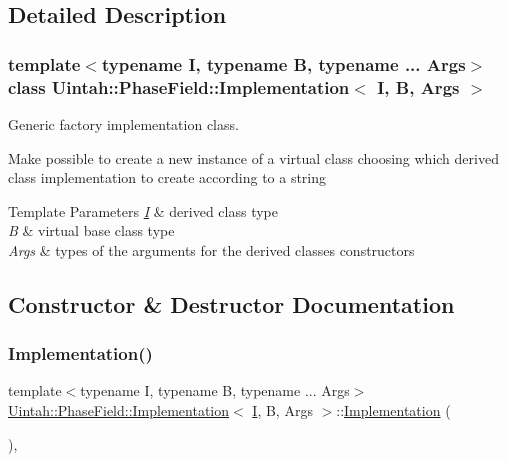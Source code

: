 \subsection{Detailed Description}
\subsubsection*{template$<$typename I, typename B, typename ... Args$>$\newline
class Uintah\+::\+Phase\+Field\+::\+Implementation$<$ I, B, Args $>$}

Generic factory implementation class. 

Make possible to create a new instance of a virtual class choosing which derived class implementation to create according to a string


\begin{DoxyTemplParams}{Template Parameters}
{\em \hyperlink{structUintah_1_1PhaseField_1_1I}{I}} & derived class type \\
\hline
{\em B} & virtual base class type \\
\hline
{\em Args} & types of the arguments for the derived classes constructors \\
\hline
\end{DoxyTemplParams}


\subsection{Constructor \& Destructor Documentation}
\mbox{\label{classUintah_1_1PhaseField_1_1Implementation_a93c3a3fe8276accce230cfbdf623b1d0}} 
\subsubsection{\texorpdfstring{Implementation()}{Implementation()}}
{\footnotesize\ttfamily template$<$typename I, typename B, typename ... Args$>$ \\
\hyperlink{classUintah_1_1PhaseField_1_1Implementation}{Uintah\+::\+Phase\+Field\+::\+Implementation}$<$ \hyperlink{structUintah_1_1PhaseField_1_1I}{I}, B, Args $>$\+::\hyperlink{classUintah_1_1PhaseField_1_1Implementation}{Implementation} (\begin{DoxyParamCaption}{ }\end{DoxyParamCaption})\hspace{0.3cm}{\ttfamily [inline]}, {\ttfamily [protected]}}



